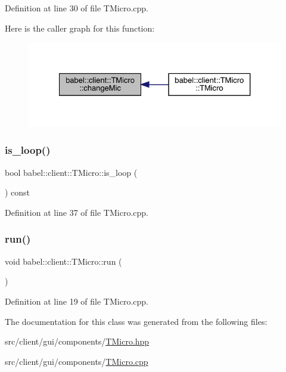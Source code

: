 Definition at line 30 of file T\+Micro.\+cpp.

Here is the caller graph for this function\+:\nopagebreak
\begin{figure}[H]
\begin{center}
\leavevmode
\includegraphics[width=327pt]{classbabel_1_1client_1_1_t_micro_aaf001f7264baf8b843088e44a12b6140_icgraph}
\end{center}
\end{figure}
\mbox{\label{classbabel_1_1client_1_1_t_micro_adb2141d5ede397e02e8c2ff966856801}} 
\subsubsection{\texorpdfstring{is\+\_\+loop()}{is\_loop()}}
{\footnotesize\ttfamily bool babel\+::client\+::\+T\+Micro\+::is\+\_\+loop (\begin{DoxyParamCaption}{ }\end{DoxyParamCaption}) const}



Definition at line 37 of file T\+Micro.\+cpp.

\mbox{\label{classbabel_1_1client_1_1_t_micro_acd6ca738c80803e43bb5868d6bb2a577}} 
\subsubsection{\texorpdfstring{run()}{run()}}
{\footnotesize\ttfamily void babel\+::client\+::\+T\+Micro\+::run (\begin{DoxyParamCaption}{ }\end{DoxyParamCaption})}



Definition at line 19 of file T\+Micro.\+cpp.



The documentation for this class was generated from the following files\+:\begin{DoxyCompactItemize}
\item 
src/client/gui/components/\mbox{\hyperlink{_t_micro_8hpp}{T\+Micro.\+hpp}}\item 
src/client/gui/components/\mbox{\hyperlink{_t_micro_8cpp}{T\+Micro.\+cpp}}\end{DoxyCompactItemize}
